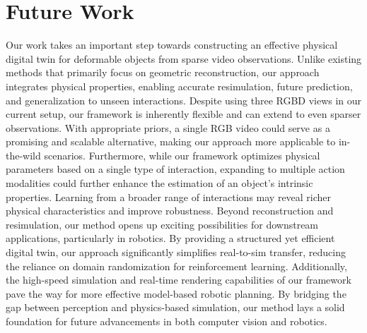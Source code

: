 \documentclass[10pt,twocolumn,letterpaper]{article}
\begin{document}
\section{Future Work}
Our work takes an important step towards constructing an effective physical digital twin for deformable objects from sparse video observations. Unlike existing methods that primarily focus on geometric reconstruction, our approach integrates physical properties, enabling accurate resimulation, future prediction, and generalization to unseen interactions. 
Despite using three RGBD views in our current setup, our framework is inherently flexible and can extend to even sparser observations. With appropriate priors, a single RGB video could serve as a promising and scalable alternative, making our approach more applicable to in-the-wild scenarios.
Furthermore, while our framework optimizes physical parameters based on a single type of interaction, expanding to multiple action modalities could further enhance the estimation of an object's intrinsic properties. Learning from a broader range of interactions may reveal richer physical characteristics and improve robustness.
Beyond reconstruction and resimulation, our method opens up exciting possibilities for downstream applications, particularly in robotics. By providing a structured yet efficient digital twin, our approach significantly simplifies real-to-sim transfer, reducing the reliance on domain randomization for reinforcement learning. Additionally, the high-speed simulation and real-time rendering capabilities of our framework pave the way for more effective model-based robotic planning.
By bridging the gap between perception and physics-based simulation, our method lays a solid foundation for future advancements in both computer vision and robotics.
\end{document}
